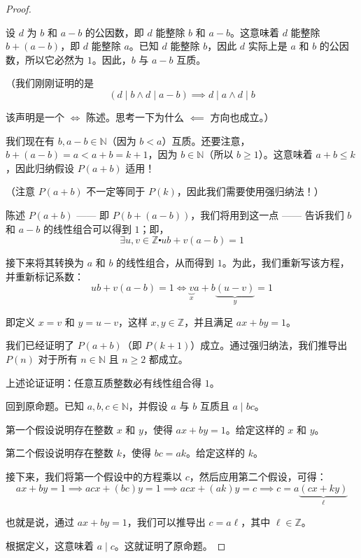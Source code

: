 \begin{proof}
\begin{tcolorbox}
            设 $d$ 为 $b$ 和 $a - b$ 的公因数，即 $d$ 能整除 $b$ 和 $a-b$。这意味着 $d$ 能整除 $b + (a-b)$，即 $d$ 能整除 $a$。已知 $d$ 能整除 $b$，因此 $d$ 实际上是 $a$ 和 $b$ 的公因数，所以它必然为 $1$。因此，$b$ 与 $a-b$ 互质。

            （我们刚刚证明的是
            \[(d \mid b \land d \mid a - b) \implies d \mid a \land d \mid b\]

            该声明是一个 $\iff$ 陈述。思考一下为什么 $\impliedby$ 方向也成立。）

            我们现在有 $b, a-b \in \mathbb{N}$（因为 $b < a$）互质。还要注意，$b + (a-b) = a < a + b = k + 1$，因为 $b \in \mathbb{N}$（所以 $b \ge 1$）。这意味着 $a + b \le k$，因此归纳假设 $P(a + b)$ 适用！

            （注意 $P(a + b)$ 不一定等同于 $P(k)$，因此我们需要使用强归纳法！）

            陈述 $P(a + b)$ —— 即 $P(b + (a - b))$，我们将用到这一点 —— 告诉我们 $b$ 和 $a - b$ 的线性组合可以得到 $1$；即，
            \[\exists u, v \in \mathbb{Z} \centerdot ub + v(a - b) = 1\]

            接下来将其转换为 $a$ 和 $b$ 的线性组合，从而得到 $1$。为此，我们重新写该方程，并重新标记系数：
            \[ub + v(a-b) = 1 \iff \underbrace{v}_{x} a + b \underbrace{(u - v)}_{y} = 1\]

            即定义 $x = v$ 和 $y = u - v$，这样 $x, y \in \mathbb{Z}$，并且满足 $ax + by = 1$。

            我们已经证明了 $P(a + b)$（即 $P(k + 1)$）成立。通过强归纳法，我们推导出 $P(n)$ 对于所有 $n \in \mathbb{N}$ 且 $n \ge 2$ 都成立。
    \end{tcolorbox}	

    上述论证证明：任意互质整数必有线性组合得 $1$。

    回到原命题。已知 $a, b, c \in \mathbb{N}$，并假设 $a$ 与 $b$ 互质且 $a \mid bc$。

    第一个假设说明存在整数 $x$ 和 $y$，使得 $ax + by = 1$。给定这样的 $x$ 和 $y$。

    第二个假设说明存在整数 $k$，使得 $bc = ak$。给定这样的 $k$。
    
    接下来，我们将第一个假设中的方程乘以 $c$，然后应用第二个假设，可得：
    \[ax + by = 1 \implies acx + (bc)y = 1 \implies acx + (ak)y = c \implies c = a\underbrace{(cx + ky)}_{\ell}\]

    也就是说，通过 $ax + by = 1$，我们可以推导出 $c = a\ell$，其中 $\ell \in \mathbb{Z}$。%

    根据定义，这意味着 $a \mid c$。这就证明了原命题。
\end{proof}

